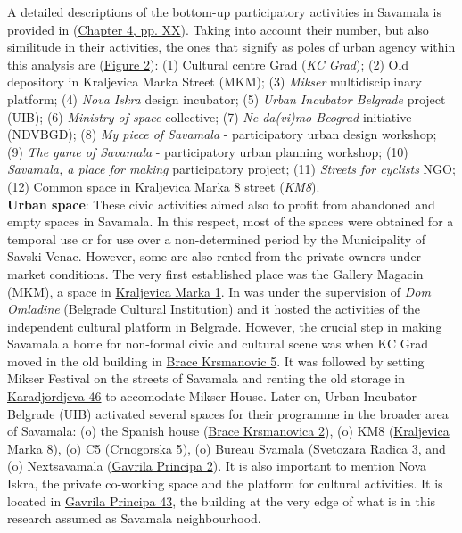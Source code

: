 \documentclass[11pt]{report}
\begin{document}
\begin{itemize}
A detailed descriptions of the bottom-up participatory activities in Savamala is provided in (\href{ref}{Chapter 4, pp. XX}).
Taking into account their number, but also similitude in their activities, the ones that signify as poles of urban agency within this analysis are (\href{ref}{Figure 2}): 
(1) Cultural centre Grad (\textit{KC Grad});
(2) Old depository in Kraljevica Marka Street (MKM);
(3) \textit{Mikser} multidisciplinary platform;
(4) \textit{Nova Iskra} design incubator;
(5) \textit{Urban Incubator Belgrade} project (UIB);
(6) \textit{Ministry of space} collective;
(7) \textit{Ne da(vi)mo Beograd} initiative (NDVBGD);
(8) \textit{My piece of Savamala} - participatory urban design workshop;
(9) \textit{The game of Savamala} - participatory urban planning workshop;
(10) \textit{Savamala, a place for making} participatory project;
(11) \textit{Streets for cyclists} NGO;
(12) Common space in Kraljevica Marka 8 street (\textit{KM8}).
\\

\textbf{Urban space}:
These civic activities aimed also to profit from abandoned and empty spaces in Savamala.
In this respect, most of the spaces were obtained for a temporal use or for use over a non-determined period by the Municipality of Savski Venac.
However, some are also rented from the private owners under market conditions.
The very first established place was the Gallery Magacin (MKM), a space in \underline{Kraljevica Marka 1}.
In was under the supervision of \textit{Dom Omladine} (Belgrade Cultural Institution) and it hosted the activities of the independent cultural platform in Belgrade.
However, the crucial step in making Savamala a home for non-formal civic and cultural scene was when KC Grad moved in the old building in \underline{Brace Krsmanovic 5}.
It was followed by setting Mikser Festival on the streets of Savamala and renting the old storage in \underline{Karadjordjeva 46} to accomodate Mikser House. Later on, Urban Incubator Belgrade (UIB) activated several spaces for their programme in the broader area of Savamala:
(o) the Spanish house (\underline{Brace Krsmanovica 2}),
(o) KM8 (\underline{Kraljevica Marka 8}),
(o) C5 (\underline{Crnogorska 5}),
(o) Bureau Svamala (\underline{Svetozara Radica 3},
and
(o) Nextsavamala (\underline{Gavrila Principa 2}). 
It is also important to mention Nova Iskra, the private co-working space and the platform for cultural activities. It is located in \underline{Gavrila Principa 43}, the building at the very edge of what is in this research assumed as Savamala neighbourhood.
\end{itemize}
 
\end{document}
